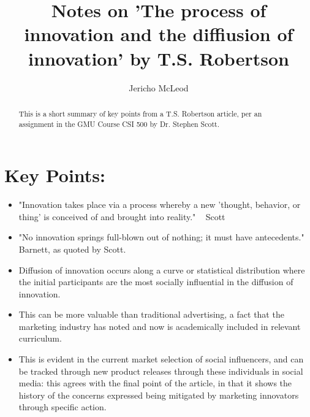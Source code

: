 \documentclass[11pt]{article}
\title{Notes on 'The process of innovation and the diffiusion of innovation' by T.S. Robertson}
\author{Jericho McLeod}
\begin{document}
\maketitle

\begin{abstract}
This is a short summary of key points from a T.S. Robertson article, per an assignment in the GMU Course CSI 500 by Dr. Stephen Scott.


\end{abstract}

\section{Key Points:}
\begin{itemize}
	\item "Innovation takes place via a process whereby a new 'thought, behavior, or thing' is conceived of and brought into reality." ~ Scott
	\item "No innovation springs full-blown out of nothing; it must have antecedents."
	~ Barnett, as quoted by Scott.
	\item Diffusion of innovation occurs along a curve or statistical distribution where the initial participants are the most socially influential in the diffusion of innovation.
	\item This can be more valuable than traditional advertising, a fact that the marketing industry has noted and now is academically included in relevant curriculum.
	\item This is evident in the current market selection of social influencers, and can be tracked through new product releases through these individuals in social media: this agrees with the final point of the article, in that it shows the history of the concerns expressed being mitigated by marketing innovators through specific action.
\end{itemize}
\end{document}
